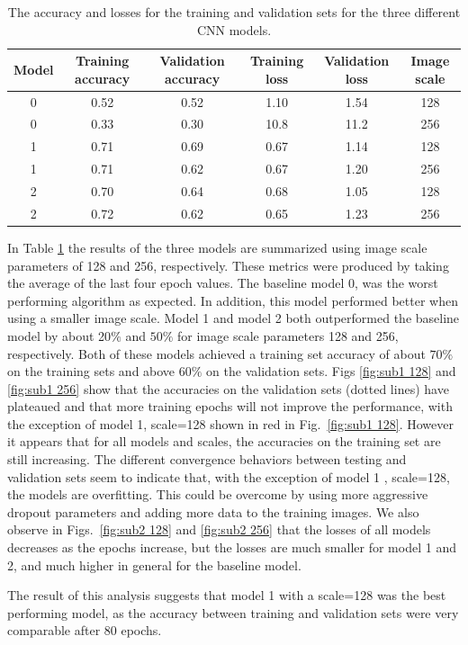 \documentclass[10pt,a4paper]{article}
\begin{document}
\begin{table}[h]
\centering
\begin{tabular}{c|cc|cc|c}
Model & Training accuracy &  Validation accuracy & Training loss  & Validation loss & Image scale \\ \hline
0 & 0.52  & 0.52 & 1.10 & 1.54 & 128    \\
0 & 0.33  & 0.30 & 10.8 & 11.2 & 256    \\ \hline
1 & 0.71  & 0.69 & 0.67 & 1.14 & 128    \\
1 & 0.71  & 0.62 & 0.67 & 1.20 & 256   \\ \hline
2 & 0.70  & 0.64 & 0.68 & 1.05 & 128    \\
2 & 0.72  & 0.62 & 0.65 & 1.23 & 256 \\ \hline
\end{tabular}
\caption{The accuracy and losses for the training and validation sets for the three different CNN models.}
\label{Table: table1}
\end{table}
In Table \ref{Table: table1} the results of the three models are summarized using image scale parameters of 128 and 256, respectively. These metrics were produced by taking the average of the last four epoch values. The baseline model 0, was the worst performing algorithm as expected. In addition, this model performed better when using a smaller image scale. Model 1 and model 2 both outperformed the baseline model by about 20$\%$ and $50\%$ for image scale parameters 128 and 256, respectively. Both of these models achieved a training set accuracy of about $70\%$ on the training sets and above $60\%$ on the validation sets. Figs \ref{fig:sub1 128} and \ref{fig:sub1 256} show that the accuracies on the validation sets (dotted lines) have plateaued and that more training epochs will not improve the performance, with the exception of model 1, scale=128 shown in red in Fig.~\ref{fig:sub1 128}. However it appears that for all models and scales, the accuracies on the training set are still increasing. The different convergence behaviors between testing and validation sets seem to indicate that, with the exception of model 1 , scale=128, the models are overfitting. This could be overcome by using more aggressive dropout parameters and adding more data to the training images. We also observe in Figs.~\ref{fig:sub2 128} and \ref{fig:sub2 256} that the losses of all models decreases as the epochs increase, but the losses are much smaller for model 1 and 2, and much higher in general for the baseline model.

The result of this analysis suggests that model 1 with a scale=128 was the best performing model, as the accuracy between training and validation sets were very comparable after 80 epochs. 
\end{document}
